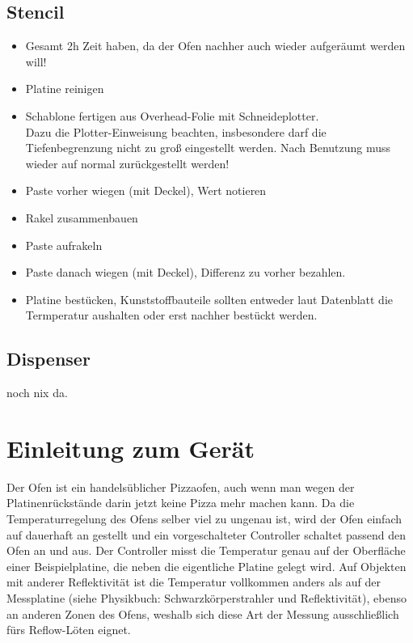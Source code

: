 \documentclass{\basedir/fablab-document}
\begin{document}
\subsection{Stencil}
\begin{itemize}
\item Gesamt 2h Zeit haben, da der Ofen nachher auch wieder aufgeräumt werden will!
\item Platine reinigen
\item Schablone fertigen aus Overhead-Folie mit Schneideplotter. \\ Dazu die Plotter-Einweisung beachten, insbesondere darf die Tiefenbegrenzung nicht zu groß eingestellt werden. Nach Benutzung muss wieder auf normal zurückgestellt werden!
\item Paste vorher wiegen (mit Deckel), Wert notieren
\item Rakel zusammenbauen
\item Paste aufrakeln
\item Paste danach wiegen (mit Deckel), Differenz zu vorher bezahlen.
\item Platine bestücken, Kunststoffbauteile sollten entweder laut Datenblatt die Termperatur aushalten oder erst nachher bestückt werden.
\end{itemize}

\subsection{Dispenser}
noch nix da. 


\section{Einleitung zum Gerät}
Der Ofen ist ein handelsüblicher Pizzaofen, auch wenn man wegen der Platinenrückstände darin jetzt keine Pizza mehr machen kann. Da die Temperaturregelung des Ofens selber viel zu ungenau ist, wird der Ofen einfach auf dauerhaft an gestellt und ein vorgeschalteter Controller schaltet passend den Ofen an und aus. Der Controller misst die Temperatur genau auf der Oberfläche einer Beispielplatine, die neben die eigentliche Platine gelegt wird. Auf Objekten mit anderer Reflektivität ist die Temperatur vollkommen anders als auf der Messplatine (siehe Physikbuch: Schwarzkörperstrahler und Reflektivität), ebenso an anderen Zonen des Ofens, weshalb sich diese Art der Messung ausschließlich fürs Reflow-Löten eignet.

\end{document}
